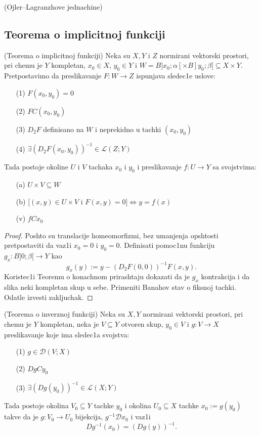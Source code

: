 \documentclass[a4paper,12pt]{article}
\begin{document}
\begin{pr}(Ojler--Lagranzhove jednachine)
\end{pr}

\subsection{Teorema o implicitnoj funkciji}

\begin{tma}
(Teorema o implicitnoj funkciji) Neka su $X, Y$ i $Z$ normirani vektorski prostori, pri chemu je $Y$ kompletan, $x_0 \in X$, $y_0 \in Y$ i $W = B]x_0; \alpha[ \times B]y_0; \beta[ \subseteq X \times Y$. Pretpostavimo da preslikavanje $F:W \to Z$ ispunjava sledec1e uslove:
\begin{enumerate}
\item[(1)] $F(x_0, y_0) = 0$
\item[(2)] $FC(x_0, y_0)$
\item[(3)] $D_2F$ definisano na $W$ i neprekidno u tachki $(x_0, y_0)$
\item[(4)] $\exists {(D_2F(x_0, y_0))}^{-1} \in \mathcal{L} (Z; Y)$
\end{enumerate}
Tada postoje okoline $U$ i $ V$ tachaka $x_0$ i $y_0$ i preslikavanje $f: U \to Y$ sa svojstvima:
\begin{enumerate}
\item[(a)] $U \times V \subseteq W$
\item[(b)] $[(x,y)\in U \times V$ i $F(x,y) = 0] \iff y = f(x)$
\item[(v)] $fCx_0$

\end{enumerate}
\end{tma}
\begin{proof}
Poshto su translacije homeomorfizmi, bez umanjenja opshtosti pretpostaviti da vaz1i $x_0 = 0 $ i $y_0 = 0$. Definisati pomoc1nu funkciju $g_x: B]0; \beta[ \to Y$ kao \[g_x(y) := y - {(D_2F(0, 0))}^{-1} F(x,y).\] Koristec1i Teoremu o konachnom prirashtaju dokazati da je $g_x$ kontrakcija i da slika neki kompletan skup u sebe. Primeniti Banahov stav o fiksnoj tachki. Odatle izvesti zakljuchak. 
\end{proof}
\begin{tma}
(Teorema o inverznoj funkciji) Neka su $X, Y$ normirani vektorski prostori, pri chemu je $Y$ kompletan, neka je $V \subseteq Y$ otvoren skup, $y_0 \in V$ i $g: V \to X$ preslikavanje koje ima sledec1a svojstva:
\begin{enumerate}
\item[(1)] $g \in \mathcal{D}(V;X)$
\item[(2)] $DgCy_0$
\item[(3)] $\exists {(Dg(y_0))}^{-1} \in \mathcal{L} (X; Y)$
\end{enumerate}
Tada postoje okolina $V_0 \subseteq Y$ tachke $y_0$ i okolina $U_0 \subseteq X$ tachke $x_0 := g(y_0)$ takve da je $g: V_0 \to U_0$ bijekcija, $g^{-1} \mathcal{D} x_0$ i vaz1i \[ Dg^{-1}(x_0) = {(Dg(y))}^{-1}.\]
\end{tma}
\end{document}
